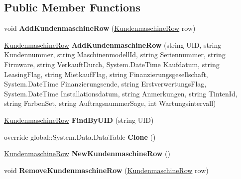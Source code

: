 \subsection*{Public Member Functions}
\begin{DoxyCompactItemize}
\item 
void {\bfseries Add\+Kundenmaschine\+Row} (\hyperlink{class_products_1_1_data_1_1ds_sage_1_1_kundenmaschine_row}{Kundenmaschine\+Row} row)\hypertarget{class_products_1_1_data_1_1ds_sage_1_1_kundenmaschine_data_table_adbec279d70807fb2428b3759e4c6ea43}{}\label{class_products_1_1_data_1_1ds_sage_1_1_kundenmaschine_data_table_adbec279d70807fb2428b3759e4c6ea43}

\item 
\hyperlink{class_products_1_1_data_1_1ds_sage_1_1_kundenmaschine_row}{Kundenmaschine\+Row} {\bfseries Add\+Kundenmaschine\+Row} (string U\+ID, string Kundennummer, string Maschinenmodell\+Id, string Seriennummer, string Firmware, string Verkauft\+Durch, System.\+Date\+Time Kaufdatum, string Leasing\+Flag, string Mietkauf\+Flag, string Finanzierungsgesellschaft, System.\+Date\+Time Finanzierungsende, string Erstverwertungs\+Flag, System.\+Date\+Time Installationsdatum, string Anmerkungen, string Tinten\+Id, string Farben\+Set, string Auftragsnummer\+Sage, int Wartungsintervall)\hypertarget{class_products_1_1_data_1_1ds_sage_1_1_kundenmaschine_data_table_ac162aad301b3204d7cdfc4a4c875eb10}{}\label{class_products_1_1_data_1_1ds_sage_1_1_kundenmaschine_data_table_ac162aad301b3204d7cdfc4a4c875eb10}

\item 
\hyperlink{class_products_1_1_data_1_1ds_sage_1_1_kundenmaschine_row}{Kundenmaschine\+Row} {\bfseries Find\+By\+U\+ID} (string U\+ID)\hypertarget{class_products_1_1_data_1_1ds_sage_1_1_kundenmaschine_data_table_afad68949eaf2ee74c289a0a2dbc6338b}{}\label{class_products_1_1_data_1_1ds_sage_1_1_kundenmaschine_data_table_afad68949eaf2ee74c289a0a2dbc6338b}

\item 
override global\+::\+System.\+Data.\+Data\+Table {\bfseries Clone} ()\hypertarget{class_products_1_1_data_1_1ds_sage_1_1_kundenmaschine_data_table_ab556e40ee615e37f0c68c37e9ff86f47}{}\label{class_products_1_1_data_1_1ds_sage_1_1_kundenmaschine_data_table_ab556e40ee615e37f0c68c37e9ff86f47}

\item 
\hyperlink{class_products_1_1_data_1_1ds_sage_1_1_kundenmaschine_row}{Kundenmaschine\+Row} {\bfseries New\+Kundenmaschine\+Row} ()\hypertarget{class_products_1_1_data_1_1ds_sage_1_1_kundenmaschine_data_table_a37b5f4f76970caa607aa65a4df390a16}{}\label{class_products_1_1_data_1_1ds_sage_1_1_kundenmaschine_data_table_a37b5f4f76970caa607aa65a4df390a16}

\item 
void {\bfseries Remove\+Kundenmaschine\+Row} (\hyperlink{class_products_1_1_data_1_1ds_sage_1_1_kundenmaschine_row}{Kundenmaschine\+Row} row)\hypertarget{class_products_1_1_data_1_1ds_sage_1_1_kundenmaschine_data_table_a1db3ddf8abe00c0da4fa33c3ccab712c}{}\label{class_products_1_1_data_1_1ds_sage_1_1_kundenmaschine_data_table_a1db3ddf8abe00c0da4fa33c3ccab712c}

\end{DoxyCompactItemize}
